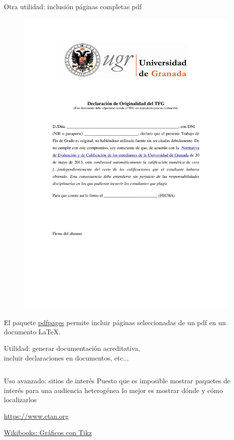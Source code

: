 \documentclass[10pt]{beamer}
\begin{document}
\begin{frame}[fragile]{Otra utilidad: inclusión páginas completas pdf}
\vspace{-4cm}
\begin{figure}
\hspace{0.5cm}
\includegraphics[width=5.cm]{./graficos/DeclaraciondeOriginalidadTFG.pdf}
\end{figure}
\vspace{1cm}
El paquete \href{https://ctan.org/pkg/pdfpages}{\color{blue}pdfpages} permite incluir páginas seleccionadas de un pdf en un documento \LaTeX{}. 

{\scriptsize Utilidad: generar documentación acreditativa, \\incluir declaraciones en documentos, etc...}

\begin{verbatim}

\end{verbatim}
\end{frame}




\begin{frame}[fragile]{Uso avanzado: sitios de interés}
Puesto que es imposible mostrar paquetes de interés para una 
audiencia heterogénea lo mejor es mostrar dónde y cómo localizarlos

\href{https://www.ctan.org}{\color{blue}https://www.ctan.org}


\href{https://es.wikibooks.org/wiki/Manual_de_LaTeX/Inclusión_de_gráficos/Gráficos_con_TikZ}{\color{blue}Wikibooks: Gráficos con Tikz}



\end{frame}


%
%
\end{document}
